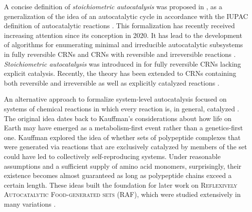 \documentclass[pdflatex]{sn-jnl}
\theoremstyle{thmstyleone}%
\theoremstyle{examplesty}%
\theoremstyle{thmstylethree}%
\newcommand{\PFS}[1]{\begingroup\color{cyan}#1\endgroup}
\begin{document}
\PFS{A concise definition of \emph{stoichiometric autocatalysis} was
  proposed in \cite{blokhuis_Universal_2020}, as a generalization of the
  idea of an autocatalytic cycle in accordance with the IUPAC definition of
  autocatalytic reactions \cite{gold_iupac_2025}.}  This formalization has
recently received increasing attention \PFS{since its conception in
  2020. It has lead to} the development of algorithms for enumerating
minimal and irreducible autocatalytic subsystems in fully reversible
\cite{kosc_thermodynamic_2025} CRNs and CRNs with reversible and
irreversible reactions \cite{gagrani_polyhedral_2024, golnik_birne_2025,
  golnik_enumeration_2026, golnik_using_2026}.  \emph{Stoichiometric
autocatalysis} was introduced in \cite{blokhuis_Universal_2020} for fully
reversible CRNs lacking explicit catalysis. Recently, the theory has been
extended to CRNs containing both reversible and irreversible as well as
explicitly catalyzed reactions \cite{golnik_autocatalytic_2026}.

An alternative approach \PFS{to formalize system-level autocatalysis}
focused on systems of chemical reactions in which every reaction is, in
general, catalyzed \cite{lohn_evolving_1998, steel_emergence_2000}. The
original idea dates back to Kauffman's considerations
\cite{kauffman_autocatalytic_1986} about how life on Earth may have emerged
as a metabolism-first event rather than a genetics-first one. Kauffman
explored the idea of whether sets of polypeptide complexes that were
generated via reactions that are exclusively catalyzed by members of the
set could have led to collectively self-reproducing systems.  Under
reasonable assumptions and a sufficient supply of amino acid monomers,
surprisingly, their existence becomes almost guaranteed as long as
polypeptide chains exceed a certain length. These ideas built the
foundation for later work on \textsc{Reflexively Autocatalytic
  Food-generated sets} (RAF), which were studied extensively in many
variations \cite{steel_emergence_2000, mossel05CAF, steel_minimal_2013,
  smith_autocatalytic_2014, hordijk_history_2019, steel20}.
\end{document}
